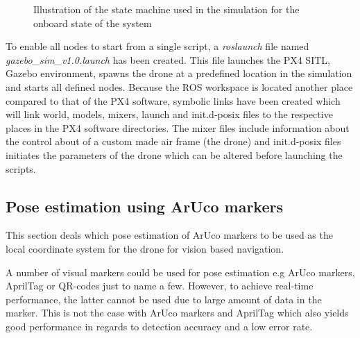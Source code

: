 \documentclass[../Head/report.tex]{subfiles}
\begin{document}
 \begin{figure}[H]
    \centering
    \scalebox{.9}{}
    \caption{Illustration of the state machine used in the simulation for the onboard state of the system}
    \label{fig:state_machine_simulation}
\end{figure}

To enable all nodes to start from a single script, a \textit{roslaunch} file named \textit{gazebo\_sim\_v1.0.launch} has been created. This file launches the PX4 SITL, Gazebo environment, spawns the drone at a predefined location in the simulation and starts all defined nodes. Because the ROS workspace is located another place compared to that of the PX4 software, symbolic links have been created which will link world, models, mixers, launch and init.d-posix files to the respective places in the PX4 software directories. The mixer files include information about the control about of a custom made air frame (the drone) and init.d-posix files initiates the parameters of the drone which can be altered before launching the scripts.   



\subsection{Pose estimation using ArUco markers}
\label{sec:pose_estimation_using_aruco_markers}

This section deals which pose estimation of ArUco markers to be used as the local coordinate system for the drone for vision based navigation. 

A number of visual markers could be used for pose estimation e.g ArUco markers, AprilTag or QR-codes just to name a few. However, to achieve real-time performance, the latter cannot be used due to large amount of data in the marker. This is not the case with ArUco markers and AprilTag which also yields good performance in regards to detection accuracy and a low error rate. \cite{visualmarkers} 
\end{document}
